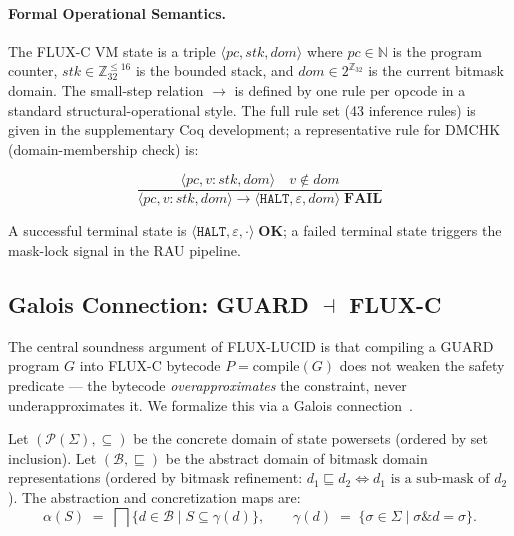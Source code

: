 \documentclass[conference]{IEEEtran}
\begin{document}
\paragraph{Formal Operational Semantics.}
The FLUX-C VM state is a triple
$\langle \mathit{pc}, \mathit{stk}, \mathit{dom} \rangle$
where $\mathit{pc} \in \mathbb{N}$ is the program counter,
$\mathit{stk} \in \mathbb{Z}_{32}^{\le 16}$ is the bounded stack, and
$\mathit{dom} \in 2^{\mathbb{Z}_{32}}$ is the current bitmask domain.
The small-step relation $\longrightarrow$ is defined by one rule per opcode
in a standard structural-operational style.
The full rule set (43 inference rules) is given in the supplementary Coq
development; a representative rule for DMCHK (domain-membership check) is:

\[
  \frac{
    \langle \mathit{pc}, v{:}\mathit{stk}, \mathit{dom} \rangle \quad
    v \notin \mathit{dom}
  }{
    \langle \mathit{pc}, v{:}\mathit{stk}, \mathit{dom} \rangle
    \longrightarrow
    \langle \mathtt{HALT}, \varepsilon, \mathit{dom} \rangle \; \mathbf{FAIL}
  }
\]

A successful terminal state is $\langle \mathtt{HALT}, \varepsilon, \cdot \rangle\; \mathbf{OK}$;
a failed terminal state triggers the mask-lock signal in the RAU pipeline.

\subsection{Galois Connection: GUARD $\dashv$ FLUX-C}
\label{sec:galois}

The central soundness argument of FLUX-LUCID is that compiling a GUARD
program $G$ into FLUX-C bytecode $P = \mathrm{compile}(G)$ does not
weaken the safety predicate — the bytecode \emph{overapproximates}
the constraint, never underapproximates it.
We formalize this via a Galois connection~\cite{cousot1977}.

\begin{definition}
\label{def:galois}
Let $(\mathcal{P}(\Sigma), \subseteq)$ be the concrete domain of state
powersets (ordered by set inclusion).
Let $(\mathcal{B}, \sqsubseteq)$ be the abstract domain of bitmask
domain representations (ordered by bitmask refinement: $d_1 \sqsubseteq d_2
\Leftrightarrow d_1 \text{ is a sub-mask of } d_2$).
The abstraction and concretization maps are:
\[
  \alpha(S) \;=\; \bigsqcap \{ d \in \mathcal{B} \mid S \subseteq \gamma(d) \},
  \qquad
  \gamma(d) \;=\; \{ \sigma \in \Sigma \mid \sigma \mathbin{\&} d = \sigma \}.
\]
\end{definition}
\end{document}
